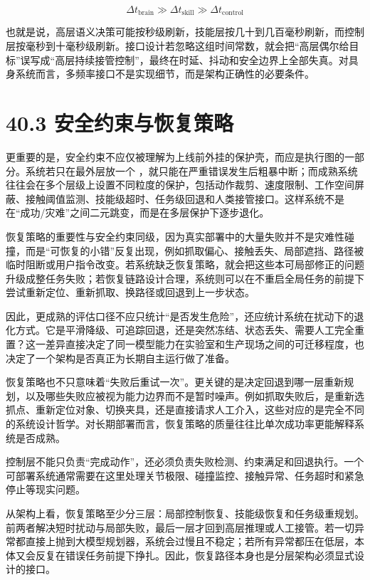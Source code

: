 \begingroup
\footnotesize
\begin{equation*}
\Delta t_{\text{brain}} \gg \Delta t_{\text{skill}} \gg \Delta t_{\text{control}}
\end{equation*}
\endgroup

也就是说，高层语义决策可能按秒级刷新，技能层按几十到几百毫秒刷新，而控制层按毫秒到十毫秒级刷新。接口设计若忽略这组时间常数，就会把“高层偶尔给目标”误写成“高层持续接管控制”，最终在时延、抖动和安全边界上全部失真。对具身系统而言，多频率接口不是实现细节，而是架构正确性的必要条件。

\section*{40.3 安全约束与恢复策略}


更重要的是，安全约束不应仅被理解为上线前外挂的保护壳，而应是执行图的一部分。系统若只在最外层放一个 \texttt{}，就只能在严重错误发生后粗暴中断；而成熟系统往往会在多个层级上设置不同粒度的保护，包括动作裁剪、速度限制、工作空间屏蔽、接触阈值监测、技能级超时、任务级回退和人类接管接口。这样系统不是在“成功/灾难”之间二元跳变，而是在多层保护下逐步退化。

恢复策略的重要性与安全约束同级，因为真实部署中的大量失败并不是灾难性碰撞，而是“可恢复的小错”反复出现，例如抓取偏心、接触丢失、局部遮挡、路径被临时阻断或用户指令改变。若系统缺乏恢复策略，就会把这些本可局部修正的问题升级成整任务失败；若恢复链路设计合理，系统则可以在不重启全局任务的前提下尝试重新定位、重新抓取、换路径或回退到上一步状态。

因此，更成熟的评估口径不应只统计“是否发生危险”，还应统计系统在扰动下的退化方式。它是平滑降级、可追踪回退，还是突然冻结、状态丢失、需要人工完全重置？这一差异直接决定了同一模型能力在实验室和生产现场之间的可迁移程度，也决定了一个架构是否真正为长期自主运行做了准备。

恢复策略也不只意味着“失败后重试一次”。更关键的是决定回退到哪一层重新规划，以及哪些失败应被视为能力边界而不是暂时噪声。例如抓取失败后，是重新选抓点、重新定位对象、切换夹具，还是直接请求人工介入，这些对应的是完全不同的系统设计哲学。对长期部署而言，恢复策略的质量往往比单次成功率更能解释系统是否成熟。

控制层不能只负责“完成动作”，还必须负责失败检测、约束满足和回退执行。一个可部署系统通常需要在这里处理关节极限、碰撞监控、接触异常、任务超时和紧急停止等现实问题。

从架构上看，恢复策略至少分三层：局部控制恢复、技能级恢复和任务级重规划。前两者解决短时扰动与局部失败，最后一层才回到高层推理或人工接管。若一切异常都直接上抛到大模型规划器，系统会过慢且不稳定；若所有异常都压在低层，本体又会反复在错误任务前提下挣扎。因此，恢复路径本身也是分层架构必须显式设计的接口。

